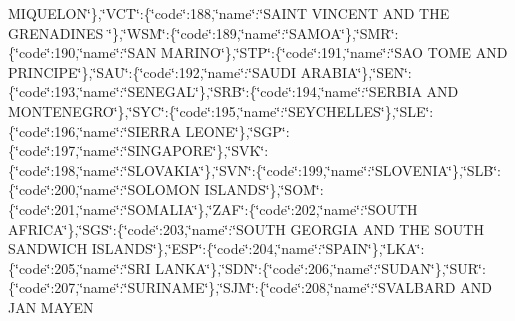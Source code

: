 \begin{DoxyCompactItemize}
M\-I\-Q\-U\-E\-L\-O\-N\char`\"{}\},\char`\"{}V\-C\-T\char`\"{}\-:\{\char`\"{}code\char`\"{}\-:188,\char`\"{}name\char`\"{}\-:\char`\"{}S\-A\-I\-N\-T V\-I\-N\-C\-E\-N\-T A\-N\-D T\-H\-E G\-R\-E\-N\-A\-D\-I\-N\-E\-S \char`\"{}\},\char`\"{}W\-S\-M\char`\"{}\-:\{\char`\"{}code\char`\"{}\-:189,\char`\"{}name\char`\"{}\-:\char`\"{}S\-A\-M\-O\-A\char`\"{}\},\char`\"{}S\-M\-R\char`\"{}\-:\{\char`\"{}code\char`\"{}\-:190,\char`\"{}name\char`\"{}\-:\char`\"{}S\-A\-N M\-A\-R\-I\-N\-O\char`\"{}\},\char`\"{}S\-T\-P\char`\"{}\-:\{\char`\"{}code\char`\"{}\-:191,\char`\"{}name\char`\"{}\-:\char`\"{}S\-A\-O T\-O\-M\-E A\-N\-D P\-R\-I\-N\-C\-I\-P\-E\char`\"{}\},\char`\"{}S\-A\-U\char`\"{}\-:\{\char`\"{}code\char`\"{}\-:192,\char`\"{}name\char`\"{}\-:\char`\"{}S\-A\-U\-D\-I A\-R\-A\-B\-I\-A\char`\"{}\},\char`\"{}S\-E\-N\char`\"{}\-:\{\char`\"{}code\char`\"{}\-:193,\char`\"{}name\char`\"{}\-:\char`\"{}S\-E\-N\-E\-G\-A\-L\char`\"{}\},\char`\"{}S\-R\-B\char`\"{}\-:\{\char`\"{}code\char`\"{}\-:194,\char`\"{}name\char`\"{}\-:\char`\"{}S\-E\-R\-B\-I\-A A\-N\-D M\-O\-N\-T\-E\-N\-E\-G\-R\-O\char`\"{}\},\char`\"{}S\-Y\-C\char`\"{}\-:\{\char`\"{}code\char`\"{}\-:195,\char`\"{}name\char`\"{}\-:\char`\"{}S\-E\-Y\-C\-H\-E\-L\-L\-E\-S\char`\"{}\},\char`\"{}S\-L\-E\char`\"{}\-:\{\char`\"{}code\char`\"{}\-:196,\char`\"{}name\char`\"{}\-:\char`\"{}S\-I\-E\-R\-R\-A L\-E\-O\-N\-E\char`\"{}\},\char`\"{}S\-G\-P\char`\"{}\-:\{\char`\"{}code\char`\"{}\-:197,\char`\"{}name\char`\"{}\-:\char`\"{}S\-I\-N\-G\-A\-P\-O\-R\-E\char`\"{}\},\char`\"{}S\-V\-K\char`\"{}\-:\{\char`\"{}code\char`\"{}\-:198,\char`\"{}name\char`\"{}\-:\char`\"{}S\-L\-O\-V\-A\-K\-I\-A\char`\"{}\},\char`\"{}S\-V\-N\char`\"{}\-:\{\char`\"{}code\char`\"{}\-:199,\char`\"{}name\char`\"{}\-:\char`\"{}S\-L\-O\-V\-E\-N\-I\-A\char`\"{}\},\char`\"{}S\-L\-B\char`\"{}\-:\{\char`\"{}code\char`\"{}\-:200,\char`\"{}name\char`\"{}\-:\char`\"{}S\-O\-L\-O\-M\-O\-N I\-S\-L\-A\-N\-D\-S\char`\"{}\},\char`\"{}S\-O\-M\char`\"{}\-:\{\char`\"{}code\char`\"{}\-:201,\char`\"{}name\char`\"{}\-:\char`\"{}S\-O\-M\-A\-L\-I\-A\char`\"{}\},\char`\"{}Z\-A\-F\char`\"{}\-:\{\char`\"{}code\char`\"{}\-:202,\char`\"{}name\char`\"{}\-:\char`\"{}S\-O\-U\-T\-H A\-F\-R\-I\-C\-A\char`\"{}\},\char`\"{}S\-G\-S\char`\"{}\-:\{\char`\"{}code\char`\"{}\-:203,\char`\"{}name\char`\"{}\-:\char`\"{}S\-O\-U\-T\-H G\-E\-O\-R\-G\-I\-A A\-N\-D T\-H\-E S\-O\-U\-T\-H S\-A\-N\-D\-W\-I\-C\-H I\-S\-L\-A\-N\-D\-S\char`\"{}\},\char`\"{}E\-S\-P\char`\"{}\-:\{\char`\"{}code\char`\"{}\-:204,\char`\"{}name\char`\"{}\-:\char`\"{}S\-P\-A\-I\-N\char`\"{}\},\char`\"{}L\-K\-A\char`\"{}\-:\{\char`\"{}code\char`\"{}\-:205,\char`\"{}name\char`\"{}\-:\char`\"{}S\-R\-I L\-A\-N\-K\-A\char`\"{}\},\char`\"{}S\-D\-N\char`\"{}\-:\{\char`\"{}code\char`\"{}\-:206,\char`\"{}name\char`\"{}\-:\char`\"{}S\-U\-D\-A\-N\char`\"{}\},\char`\"{}S\-U\-R\char`\"{}\-:\{\char`\"{}code\char`\"{}\-:207,\char`\"{}name\char`\"{}\-:\char`\"{}S\-U\-R\-I\-N\-A\-M\-E\char`\"{}\},\char`\"{}S\-J\-M\char`\"{}\-:\{\char`\"{}code\char`\"{}\-:208,\char`\"{}name\char`\"{}\-:\char`\"{}S\-V\-A\-L\-B\-A\-R\-D A\-N\-D J\-A\-N M\-A\-Y\-E\-N 
\end{DoxyCompactItemize}
